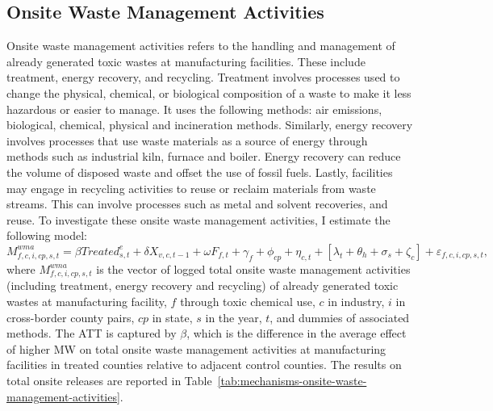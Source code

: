 \documentclass[12pt, english]{article}
\begin{document}
    \subsection{Onsite Waste Management Activities}\label{subsec:onsite-waste-management-activities}
    Onsite waste management activities refers to the handling and management of already generated toxic wastes at manufacturing facilities. These include treatment, energy recovery, and recycling. Treatment involves processes used to change the physical, chemical, or biological composition of a waste to make it less hazardous or easier to manage. It uses the following methods: air emissions, biological, chemical, physical and incineration methods. Similarly, energy recovery involves processes that use waste materials as a source of energy through methods such as industrial kiln, furnace and boiler. Energy recovery can reduce the volume of disposed waste and offset the use of fossil fuels. Lastly, facilities may engage in recycling activities to reuse or reclaim materials from waste streams. This can involve processes such as metal and solvent recoveries, and reuse. To investigate these onsite waste management activities, I estimate the following model:
    \begin{equation}
        M_{f,c,i,cp,s,t}^{wma} = \beta Treated_{s,t}^e + \delta X_{v,c,t-1} + \omega F_{f,t} + \gamma_{f} + \phi_{cp} + \eta_{c,t} + \left[\lambda_{t} + \theta_{h} + \sigma_{s} + \zeta_{c} \right] + \varepsilon_{f,c,i,cp,s,t},\label{eq:mechanisms-waste-management}
    \end{equation}
    where $M_{f,c,i,cp,s,t}^{wma}$ is the vector of logged total onsite waste management activities (including treatment, energy recovery and recycling) of already generated toxic wastes at manufacturing facility, $f$ through toxic chemical use, $c$ in industry, $i$ in cross-border county pairs, $cp$ in state, $s$ in the year, $t$, and dummies of associated methods. The ATT is captured by $\beta$, which is the difference in the average effect of higher MW on total onsite waste management activities at manufacturing facilities in treated counties relative to adjacent control counties. The results on total onsite releases are reported in Table~\ref{tab:mechanisms-onsite-waste-management-activities}.
    
\end{document}
